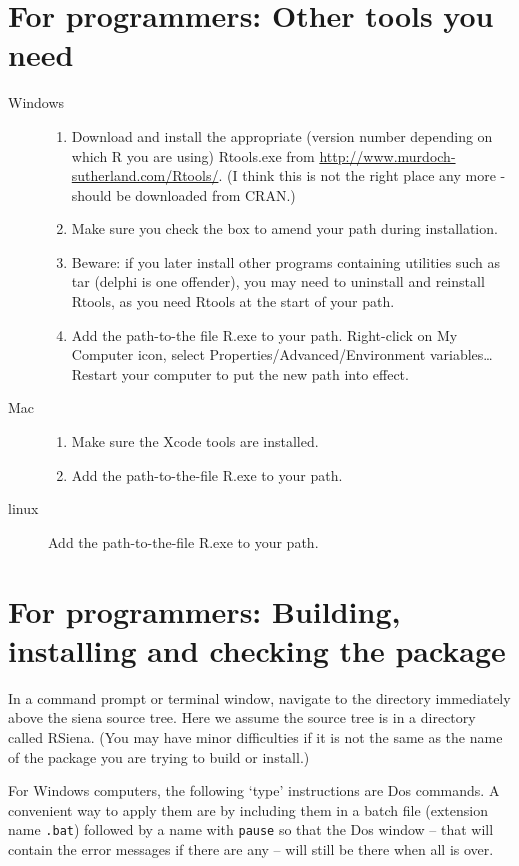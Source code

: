\documentclass[a4paper,fleqn,11pt]{article}
\newcommand{\+}{\, + \,}
\newcommand{\sfn}[1]{\textsf{#1}}
\newcommand{\R}{{\sf R }}
\begin{document}
\section{For programmers: Other tools you need}
\begin{description}
\item[Windows]
\begin{enumerate}
\item Download and install the appropriate (version number
  depending on which \R you are using)
\textsf{Rtools.exe} from
  \url{http://www.murdoch-sutherland.com/Rtools/}.
  (I think this is not the right place any more - should be downloaded from CRAN.)
\item Make sure you check the box to amend your path during installation.
\item Beware: if you later install
  other programs containing utilities such as tar (delphi is one offender),
  you may need to uninstall and reinstall Rtools, as you need Rtools
  at the start of your path.
\item Add the path-to-the file
 R.exe to your path. Right-click on My Computer icon,
  select Properties/Advanced/Environment variables\ldots   \\
 Restart your computer to put the new path into effect.
\end{enumerate}
\item[Mac]
\begin{enumerate}
\item Make sure the Xcode tools are installed.
\item Add the path-to-the-file R.exe to your path.
\end{enumerate}
\item[linux]
 Add the path-to-the-file R.exe to your path.
\end{description}

\section{For programmers: Building, installing and checking the package}
In a command prompt or terminal window, navigate to the directory
immediately above the
siena source tree. Here we assume the source tree is in a directory
called \sfn{RSiena}. (You may have minor
difficulties if it is not the same as the name of the package you are trying to
build or install.)

For Windows computers, the following `type' instructions are Dos commands.
A convenient way to apply them are by including them in a batch
file (extension name \texttt{.bat}) followed by a name with \verb|pause|
so that the Dos window -- that will contain the error messages
if there are any -- will still be there when all is over.
\end{document}
